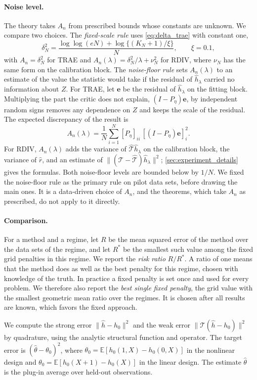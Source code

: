 \documentclass[12pt]{article}
\theoremstyle{plain}
\theoremstyle{definition}
\theoremstyle{remark}
\begin{document}
\paragraph{Noise level.}
The theory takes $A_n$ from prescribed bounds whose constants are unknown. We compare two choices. The \emph{fixed-scale rule} uses \eqref{eq:delta_trae} with constant one,
\[
\delta_N^2=\frac{\log\log(eN)+\log\{(K_N+1)/\xi\}}{N},
\qquad \xi=0.1,
\]
with $A_n=\delta_N^2$ for TRAE and $A_n(\lambda)=\delta_N^2/\lambda+\nu_N^2$ for RDIV, where $\nu_N$ has the same form on the calibration block. The \emph{noise-floor rule} sets $A_n(\lambda)$ to an estimate of the value the statistic would take if the residual of $\hat h_\lambda$ carried no information about $Z$. For TRAE, let $\boldsymbol e$ be the residual of $\hat h_\lambda$ on the fitting block. Multiplying the part the critic does not explain, $(I-P_\eta)\boldsymbol e$, by independent random signs removes any dependence on $Z$ and keeps the scale of the residual. The expected discrepancy of the result is
\[
A_n(\lambda)=\frac1N\sum_{i=1}^N[P_\eta]_{ii}\,[(I-P_\eta)\boldsymbol e]_i^2 .
\]
For RDIV, $A_n(\lambda)$ adds the variance of $\hat{\mathcal T}\hat h_\lambda$ on the calibration block, the variance of $\hat r$, and an estimate of $\|(\mathcal T-\hat{\mathcal T})\hat h_\lambda\|^2$; \cref{sec:experiment_details} gives the formulas. Both noise-floor levels are bounded below by $1/N$. We fixed the noise-floor rule as the primary rule on pilot data sets, before drawing the main ones. It is a data-driven choice of $A_n$, and the theorems, which take $A_n$ as prescribed, do not apply to it directly.

\paragraph{Comparison.}
For a method and a regime, let $R$ be the mean squared error of the method over the data sets of the regime, and let $R^\ast$ be the smallest such value among the fixed grid penalties in this regime. We report the \emph{risk ratio} $R/R^\ast$. A ratio of one means that the method does as well as the best penalty for this regime, chosen with knowledge of the truth. In practice a fixed penalty is set once and used for every problem. We therefore also report the \emph{best single fixed penalty}, the grid value with the smallest geometric mean ratio over the regimes. It is chosen after all results are known, which favors the fixed approach.

We compute the strong error $\|\hat h-h_0\|^2$ and the weak error $\|\mathcal T(\hat h-h_0)\|^2$ by quadrature, using the analytic structural function and operator. The target error is $(\hat\theta-\theta_0)^2$, where $\theta_0=\mathbb E[h_0(1,X)-h_0(0,X)]$ in the nonlinear design and $\theta_0=\mathbb E[h_0(X+1)-h_0(X)]$ in the linear design. The estimate $\hat\theta$ is the plug-in average over held-out observations.
\end{document}
